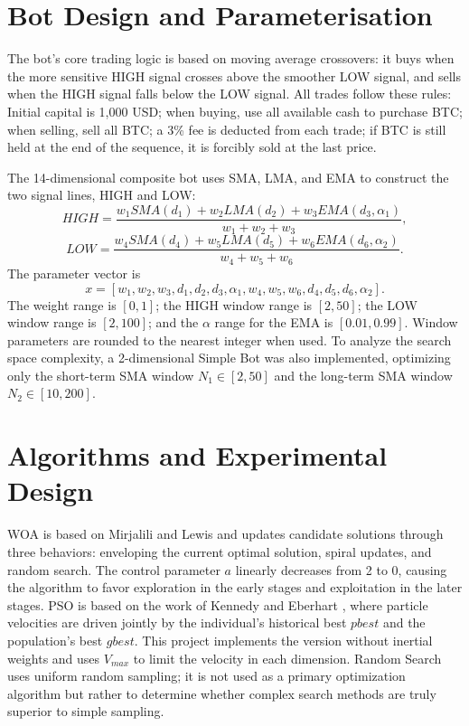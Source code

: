 \documentclass[11pt,a4paper]{article}
\begin{document}
\section{Bot Design and Parameterisation}

The bot’s core trading logic is based on moving average crossovers: it buys when the more sensitive HIGH signal crosses above the smoother LOW signal, and sells when the HIGH signal falls below the LOW signal.
All trades follow these rules: Initial capital is 1,000 USD; when buying, use all available cash to purchase BTC; when selling, sell all BTC; a 3\% fee is deducted from each trade; if BTC is still held at the end of the sequence, it is forcibly sold at the last price.

The 14-dimensional composite bot uses SMA, LMA, and EMA to construct the two signal lines, HIGH and LOW:
\begin{equation}
HIGH=\frac{w_1SMA(d_1)+w_2LMA(d_2)+w_3EMA(d_3,\alpha_1)}{w_1+w_2+w_3},
\end{equation}
\begin{equation}
LOW=\frac{w_4SMA(d_4)+w_5LMA(d_5)+w_6EMA(d_6,\alpha_2)}{w_4+w_5+w_6}.
\end{equation}
The parameter vector is
\[
x=[w_1,w_2,w_3,d_1,d_2,d_3,\alpha_1,w_4,w_5,w_6,d_4,d_5,d_6,\alpha_2].
\]
The weight range is $[0,1]$; the HIGH window range is $[2,50]$; the LOW window range is $[2,100]$; and the $\alpha$ range for the EMA is $[0.01,0.99]$. Window parameters are rounded to the nearest integer when used. To analyze the search space complexity, a 2-dimensional Simple Bot was also implemented, optimizing only the short-term SMA window $N_1\in[2,50]$ and the long-term SMA window $N_2\in[10,200]$.


\section{Algorithms and Experimental Design}

WOA is based on Mirjalili and Lewis \cite{mirjalili2016} and updates candidate solutions through three behaviors: enveloping the current optimal solution, spiral updates, and random search. The control parameter $a$ linearly decreases from 2 to 0, causing the algorithm to favor exploration in the early stages and exploitation in the later stages. PSO is based on the work of Kennedy and Eberhart \cite{kennedy1995}, where particle velocities are driven jointly by the individual’s historical best $pbest$ and the population’s best $gbest$. This project implements the version without inertial weights and uses $V_{max}$ to limit the velocity in each dimension. Random Search uses uniform random sampling; it is not used as a primary optimization algorithm but rather to determine whether complex search methods are truly superior to simple sampling.
\end{document}
